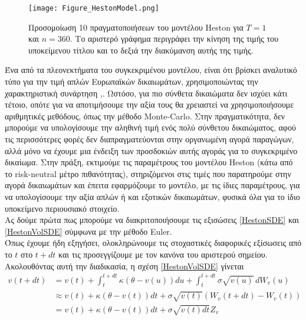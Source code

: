 \documentclass[12pt,a4paper,twoside,openany]{book}
\begin{document}
 	\begin{figure}[h]
 		\centering
 		\texttt{[image: Figure\_HestonModel.png]}
 		\caption{Προσομοίωση 10 πραγματοποιήσεων του μοντέλου Heston για $T=1$ και $n=360$. Το αριστερό γράφημα περιγράφει την κίνηση της τιμής του υποκείμενου τίτλου και το δεξιά την διακύμανση αυτής της τιμής.}
 		\label{fig:HestonModel}
 		\vspace{4mm}
 	\end{figure}
 	\noindent Ένα από τα πλεονεκτήματα του συγκεκριμένου μοντέλου, είναι ότι βρίσκει αναλυτικό τύπο για την τιμή απλών Ευρωπαϊκών δικαιωμάτων, χρησιμοποιώντας την χαρακτηριστική συνάρτηση \cite{Heston},\cite{Keras}. Ωστόσο, για πιο σύνθετα δικαιώματα δεν ισχύει κάτι τέτοιο, οπότε για να αποτιμήσουμε την αξία τους θα χρειαστεί να χρησιμοποιήσουμε αριθμητικές μεθόδους, όπως την μέθοδο Monte-Carlo. Στην πραγματικότητα, δεν μπορούμε να υπολογίσουμε την αληθινή τιμή ενός πολύ σύνθετου δικαιώματος, αφού τις περισσότερες φορές δεν διαπραγματεύονται στην οργανωμένη αγορά παραγώγων, αλλά μόνο να έχουμε μια ένδειξη των προσδοκιών αυτής αγοράς για το συγκεκριμένο δικαίωμα. Στην πράξη, εκτιμούμε τις παραμέτρους του μοντέλου Heston (κάτω από το risk-neutral μέτρο πιθανότητας), στηριζόμενοι στις τιμές που παρατηρούμε στην αγορά δικαιωμάτων και έπειτα εφαρμόζουμε το μοντέλο, με τις ίδιες παραμέτρους, για να υπολογίσουμε την αξία απλών ή και εξοτικών δικαιωμάτων, φυσικά όλα για το ίδιο υποκείμενο περιουσιακό στοιχείο.
 	\vspace{2.5mm}\\
 	Ας δούμε πρώτα πως μπορούμε να διακριτοποιήσουμε τις εξισώσεις \eqref{HestonSDE} και \eqref{HestonVolSDE} σύμφωνα με την μέθοδο Euler.\\
 	Όπως έχουμε ήδη εξηγήσει, ολοκληρώνουμε τις στοχαστικές διαφορικές εξίσωσεις από το $t$ στο $t+dt$ και τις προσεγγίζουμε με τον κανόνα του αριστερού σημείου. \\
 	Ακολουθόντας αυτή την διαδικασία, η σχέση \eqref{HestonVolSDE} γίνεται
 	\begin{align*}
 		v(t+dt) &= v(t) + \int_{t}^{t+dt}\kappa(\theta - v(u))du + \int_{t}^{t+dt}\sigma\sqrt{v(u)}\, dW_v(u) \\	
 				&\approx  v(t) + \kappa(\theta - v(t))dt + \sigma\sqrt{v(t)}(W_v(t+dt) - W_v(t)) \\
 				&=  v(t) + \kappa(\theta - v(t))dt + \sigma\sqrt{v(t)dt}Z_v
 	\end{align*}
\end{document}

